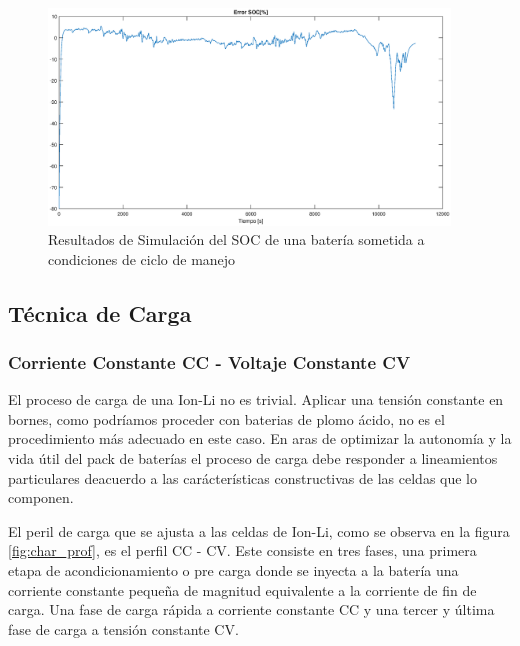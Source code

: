 \documentclass[10pt,a4paper]{article}
\begin{document}
	\begin{figure}[h!]
		\begin{center}
			\includegraphics[width=0.95\textwidth]{soc_error_porc.eps}
			\caption{Resultados de Simulación del SOC de una batería sometida a condiciones de ciclo de manejo}
			\label{error_SOC_Sim}
		\end{center}
	\end{figure}
	\FloatBarrier

\subsection{Técnica de Carga}
	\subsubsection{Corriente Constante CC - Voltaje Constante CV}

El proceso de carga de una \acrfull{Ion-Li} no es trivial. Aplicar una tensión
constante en  bornes, como podríamos proceder con baterias de plomo
ácido, no es el procedimiento más adecuado en este caso. En aras de optimizar la autonomía y la vida útil del pack de baterías el
proceso de carga debe responder a lineamientos particulares deacuerdo a las
carácterísticas constructivas de las celdas que lo componen.

El peril de carga que se ajusta a las celdas de \acrshort{Ion-Li}, como se observa en la
figura \ref{fig:char_prof}, es el perfil \acrfull{CC} - \acrfull{CV}. Este consiste en tres fases, una primera etapa de
acondicionamiento o pre carga donde se inyecta a la batería una corriente
constante pequeña de magnitud equivalente a la corriente de fin de carga. Una
fase de carga rápida a corriente constante \acrshort{CC} y una tercer y última
fase de carga a tensión constante \acrshort{CV}.
	
\end{document}
